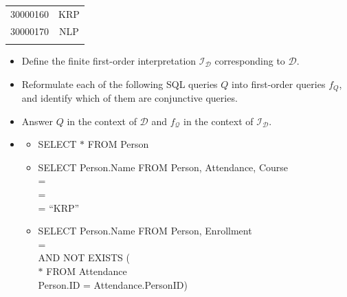 \documentclass[12pt,a4paper]{article}
\newenvironment{problem}[2][{\color{red}Question}]{\begin{trivlist}
\item[\hskip \labelsep {\bfseries #1}\hskip \labelsep {\bfseries #2.}]}{\end{trivlist}}
\begin{document}
\begin{problem}{{\color{red}3}}
\begin{table}[ht]
\begin{center}
{\begin{tabular}{|c|c|}
\textsf{30000160}&  \textsf{KRP}\\

\textsf{30000170}&  \textsf{NLP}\\

&  \\
\hline
\end{tabular}
}
\end{center}
\end{table}
\begin{itemize}
    \item[-] Define the finite first-order interpretation $\mathcal{I}_{\mathcal{D}}$ corresponding to $\mathcal{D}$. 
    \item[-] Reformulate each of the following SQL queries $Q$ into first-order queries $f_{Q}$, and identify which of them are conjunctive queries.
    \item[-] Answer $Q$ in the context of $\mathcal{D}$ and $f_{\mathcal{Q}}$ in the context of $\mathcal{I}_{\mathcal{D}}$.
    \item[]\begin{itemize}
    \item[1.] \textsf{SELECT} $\ast$ \textsf{FROM} Person
    \item[2.] \textsf{SELECT} Person.Name \textsf{FROM} Person, Attendance, Course\\
        = \\
        = \\
        = ``\textsf{KRP}''
    \item[3.] \textsf{SELECT} Person.Name \textsf{FROM} Person, Enrollment\\
        = \\
       \textsf{AND NOT EXISTS (}\\
        $\ast$ \textsf{FROM} Attendance\\
        Person.ID = Attendance.PersonID\textsf{)}
\end{itemize}
\end{itemize}

\end{problem}
\end{document}
